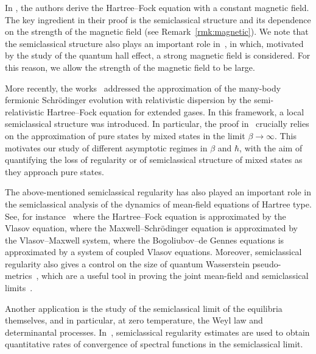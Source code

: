 \documentclass[11pt]{amsart}
\theoremstyle{plain}
\theoremstyle{definition}
\renewcommand	{\(}			{\lt(}
\renewcommand	{\)}			{\rt)}
\begin{document}
    In \cite{benedikter_derivation_2025}, the authors derive the Hartree--Fock equation with a constant magnetic field. The key ingredient in their proof is the semiclassical structure and its dependence on the strength of the magnetic field (see Remark~\ref{rmk:magnetic}). We note that
    the semiclassical structure also plays an important role in~\cite{perice_gyrokinetic_2024}, in which, motivated by the study of the quantum hall effect, a strong magnetic field is considered. For this reason, we allow the strength of the magnetic field to be large.
    
	More recently, the works~\cite{fresta_effective_2023, fresta_effective_2025} addressed the approximation of the many-body fermionic Schrödinger evolution with relativistic dispersion by the semi-relativistic Hartree–Fock equation for extended gases. In this framework, a local semiclassical structure was introduced. In particular, the proof in~\cite{fresta_effective_2025} crucially relies  on the approximation of pure states by mixed states in the limit $\beta \to \infty$. This motivates our study of different asymptotic regimes in $\beta$ and $\hbar$, with the aim of quantifying the loss of regularity or of semiclassical structure of mixed states as they approach pure states.

	The above-mentioned semiclassical regularity has also played an important role in the semiclassical analysis of the dynamics of mean-field equations of Hartree type. See, for instance~\cite{benedikter_hartree_2016} where the Hartree--Fock equation is approximated by the Vlasov equation, \cite{leopold_derivation_2026} where the Maxwell--Schr\"odinger equation is approximated by the Vlasov--Maxwell system, \cite{chong_semiclassical_2025} where the Bogoliubov--de Gennes equations is approximated by a system of coupled Vlasov equations. Moreover, semiclassical regularity also gives a control on the size of quantum Wasserstein pseudo-metrics~\cite{golse_semiclassical_2021, lafleche_quantum_2023}, which are a useful tool in proving the joint mean-field and semiclassical limits~\cite{golse_mean_2016, golse_schrodinger_2017, lafleche_propagation_2019, cardenas_effective_2025}.

    Another application is the study of the semiclassical limit of the equilibria themselves, and in particular, at zero temperature, the Weyl law and determinantal processes. In~\cite{deleporte_universality_2024, cardenas_commutator_2025, cardenas_quantitative_2025}, semiclassical regularity estimates are used to obtain quantitative rates of convergence of spectral functions in the semiclassical limit.
    
\end{document}

